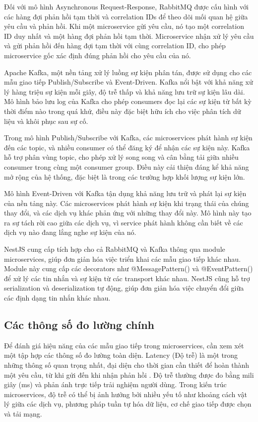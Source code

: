 Đối với mô hình Asynchronous Request-Response, RabbitMQ được cấu hình với các hàng đợi phản hồi tạm thời và correlation IDs để theo dõi mối quan hệ giữa yêu cầu và phản hồi. Khi một microservice gửi yêu cầu, nó tạo một correlation ID duy nhất và một hàng đợi phản hồi tạm thời. Microservice nhận xử lý yêu cầu và gửi phản hồi đến hàng đợi tạm thời với cùng correlation ID, cho phép microservice gốc xác định đúng phản hồi cho yêu cầu của nó.

Apache Kafka, một nền tảng xử lý luồng sự kiện phân tán, được sử dụng cho các mẫu giao tiếp Publish/Subscribe và Event-Driven. Kafka nổi bật với khả năng xử lý hàng triệu sự kiện mỗi giây, độ trễ thấp và khả năng lưu trữ sự kiện lâu dài. Mô hình bảo lưu log của Kafka cho phép consumers đọc lại các sự kiện từ bất kỳ thời điểm nào trong quá khứ, điều này đặc biệt hữu ích cho việc phân tích dữ liệu và khôi phục sau sự cố.

Trong mô hình Publish/Subscribe với Kafka, các microservices phát hành sự kiện đến các topic, và nhiều consumer có thể đăng ký để nhận các sự kiện này. Kafka hỗ trợ phân vùng topic, cho phép xử lý song song và cân bằng tải giữa nhiều consumer trong cùng một consumer group. Điều này cải thiện đáng kể khả năng mở rộng của hệ thống, đặc biệt là trong các trường hợp khối lượng sự kiện lớn.

Mô hình Event-Driven với Kafka tận dụng khả năng lưu trữ và phát lại sự kiện của nền tảng này. Các microservices phát hành sự kiện khi trạng thái của chúng thay đổi, và các dịch vụ khác phản ứng với những thay đổi này. Mô hình này tạo ra sự tách rời cao giữa các dịch vụ, vì service phát hành không cần biết về các dịch vụ nào đang lắng nghe sự kiện của nó.

NestJS cung cấp tích hợp cho cả RabbitMQ và Kafka thông qua module microservices, giúp đơn giản hóa việc triển khai các mẫu giao tiếp khác nhau. Module này cung cấp các decorators như @MessagePattern() và @EventPattern() để xử lý các tin nhắn và sự kiện từ các transport khác nhau. NestJS cũng hỗ trợ serialization và deserialization tự động, giúp đơn giản hóa việc chuyển đổi giữa các định dạng tin nhắn khác nhau.

\subsection{Các thông số đo lường chính}
Để đánh giá hiệu năng của các mẫu giao tiếp trong microservices, cần xem xét một tập hợp các thông số đo lường toàn diện. Latency (Độ trễ) là một trong những thông số quan trọng nhất, đại diện cho thời gian cần thiết để hoàn thành một yêu cầu, từ khi gửi đến khi nhận phản hồi \cite{jun2018}. Độ trễ thường được đo bằng mili giây (ms) và phản ánh trực tiếp trải nghiệm người dùng. Trong kiến trúc microservices, độ trễ có thể bị ảnh hưởng bởi nhiều yếu tố như khoảng cách vật lý giữa các dịch vụ, phương pháp tuần tự hóa dữ liệu, cơ chế giao tiếp được chọn và tải mạng.

